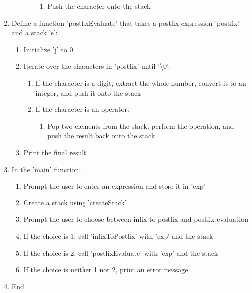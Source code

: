 \documentclass{article}
\begin{document}
\begin{enumerate}
\begin{enumerate}
\begin{enumerate}
\begin{enumerate}
              \item Push the character onto the stack
            \end{enumerate}
        \end{enumerate}
    \end{enumerate}
  \item Define a function 'postfixEvaluate' that takes a postfix expression 'postfix' and a stack 's':
    \begin{enumerate}
      \item Initialize 'j' to 0
      \item Iterate over the characters in 'postfix' until '\textbackslash 0':
        \begin{enumerate}
          \item If the character is a digit, extract the whole number, convert it to an integer, and push it onto the stack
          \item If the character is an operator:
            \begin{enumerate}
              \item Pop two elements from the stack, perform the operation, and push the result back onto the stack
            \end{enumerate}
        \end{enumerate}
      \item Print the final result
    \end{enumerate}
  \item In the 'main' function:
    \begin{enumerate}
      \item Prompt the user to enter an expression and store it in 'exp'
      \item Create a stack using 'createStack'
      \item Prompt the user to choose between infix to postfix and postfix evaluation
      \item If the choice is 1, call 'infixToPostfix' with 'exp' and the stack
      \item If the choice is 2, call 'postfixEvaluate' with 'exp' and the stack
      \item If the choice is neither 1 nor 2, print an error message
    \end{enumerate}
  \item End
\end{enumerate}
\end{document}
